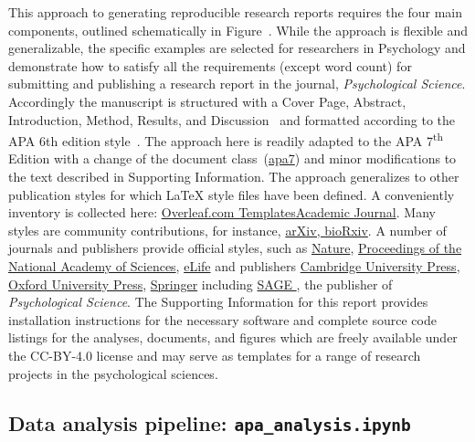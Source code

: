\documentclass[helv,10pt,man,floatsintext]{apa6}  %
\begin{document}
This approach to generating reproducible research reports requires
the four main components, outlined schematically in
Figure~. While the approach is flexible and
generalizable, the specific examples are selected for researchers in
Psychology and demonstrate how to satisfy all the requirements (except
word count) for submitting and publishing a research report in the
journal, {\it Psychological Science}. Accordingly the manuscript is
structured with a Cover Page, Abstract, Introduction, Method, Results,
and Discussion~\parencite{APSStructStyle} and formatted according to
the APA 6th edition style~\parencite{APAStyle6th}. The approach here
is readily adapted to the APA 7\textsuperscript{th} Edition with a
change of the document
class~({\href{https://www.overleaf.com/project/5f3053af0af0dc00016f191b}{apa7}})
and minor modifications to the text described in Supporting
Information. The approach generalizes to other publication styles for
which \LaTeX{} style files have been defined.  A conveniently inventory
is collected here:
\href{https://www.overleaf.com/latex/templates/tagged/academic-journal}{Overleaf.com
  Templates\textemdash Academic Journal}. Many styles are community
contributions, for instance,
\href{https://www.overleaf.com/latex/templates/tagged/arxiv}{arXiv,
  bioRxiv}.
%
A number of journals and publishers provide official styles, such as
%
\href{https://www.overleaf.com/latex/templates/tagged/npg}{Nature},
\href{https://www.overleaf.com/latex/templates/tagged/pnas}{Proceedings of the National Academy of Sciences},
\href{https://www.overleaf.com/latex/templates/tagged/elife-official}{eLife}
%
and publishers
%
\href{https://www.overleaf.com/latex/templates/tagged/cup-official}{Cambridge University Press},
\href{https://www.overleaf.com/latex/templates/oup-general-template/fqkhysbcbpwv}{Oxford University Press},
\href{https://www.overleaf.com/latex/templates/tagged/springer}{Springer}
%
including 
%
\href{
  https://www.overleaf.com/latex/templates/a-demonstration-of-the-latex2e-class-file-for-sage-publications/jcdyknyjrkzb
}{
  SAGE
},
%
the publisher of {\em Psychological Science}.
%
The Supporting Information for this report provides installation
instructions for the necessary software and complete source code
listings for the analyses, documents, and figures which are freely
available under the CC-BY-4.0 license and may serve as templates for
a range of research projects in the psychological sciences.


\subsection{Data analysis pipeline: \texttt{apa_analysis.ipynb}}
\end{document}

